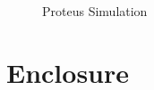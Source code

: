   \begin{figure}[h]
  \noindent{}
  \caption{Proteus Simulation}
\end{figure}
\newpage

\section{Enclosure}

